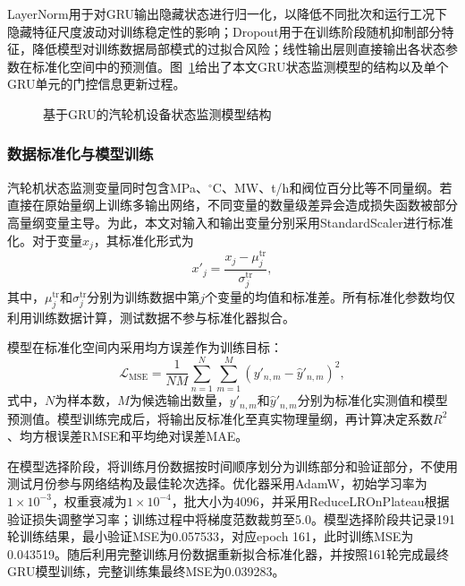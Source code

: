 LayerNorm用于对GRU输出隐藏状态进行归一化，以降低不同批次和运行工况下隐藏特征尺度波动对训练稳定性的影响；Dropout用于在训练阶段随机抑制部分特征，降低模型对训练数据局部模式的过拟合风险；线性输出层则直接输出各状态参数在标准化空间中的预测值。图~\ref{fig:gru_architecture}给出了本文GRU状态监测模型的结构以及单个GRU单元的门控信息更新过程。

\begin{figure}[htbp]
    \centering
    \caption{基于GRU的汽轮机设备状态监测模型结构}
    \label{fig:gru_architecture}
\end{figure}

\subsubsection{数据标准化与模型训练}

汽轮机状态监测变量同时包含MPa、$^{\circ}$C、MW、t/h和阀位百分比等不同量纲。若直接在原始量纲上训练多输出网络，不同变量的数量级差异会造成损失函数被部分高量纲变量主导。为此，本文对输入和输出变量分别采用StandardScaler进行标准化。对于变量$x_j$，其标准化形式为
\begin{equation}
    x'_{j}=
    \frac{x_j-\mu_j^{\mathrm{tr}}}
    {\sigma_j^{\mathrm{tr}}},
    \label{eq:standardization}
\end{equation}
其中，$\mu_j^{\mathrm{tr}}$和$\sigma_j^{\mathrm{tr}}$分别为训练数据中第$j$个变量的均值和标准差。所有标准化参数均仅利用训练数据计算，测试数据不参与标准化器拟合。

模型在标准化空间内采用均方误差作为训练目标：
\begin{equation}
    \mathcal{L}_{\mathrm{MSE}}
    =
    \frac{1}{NM}
    \sum_{n=1}^{N}
    \sum_{m=1}^{M}
    \left(
    y'_{n,m}-\hat{y}'_{n,m}
    \right)^2,
    \label{eq:mse_loss}
\end{equation}
式中，$N$为样本数，$M$为候选输出数量，$y'_{n,m}$和$\hat{y}'_{n,m}$分别为标准化实测值和模型预测值。模型训练完成后，将输出反标准化至真实物理量纲，再计算决定系数$R^2$、均方根误差RMSE和平均绝对误差MAE。

在模型选择阶段，将训练月份数据按时间顺序划分为训练部分和验证部分，不使用测试月份参与网络结构及最佳轮次选择。优化器采用AdamW，初始学习率为$1\times10^{-3}$，权重衰减为$1\times10^{-4}$，批大小为4096，并采用ReduceLROnPlateau根据验证损失调整学习率；训练过程中将梯度范数裁剪至5.0。模型选择阶段共记录191轮训练结果，最小验证MSE为0.057533，对应epoch 161，此时训练MSE为0.043519。随后利用完整训练月份数据重新拟合标准化器，并按照161轮完成最终GRU模型训练，完整训练集最终MSE为0.039283。

